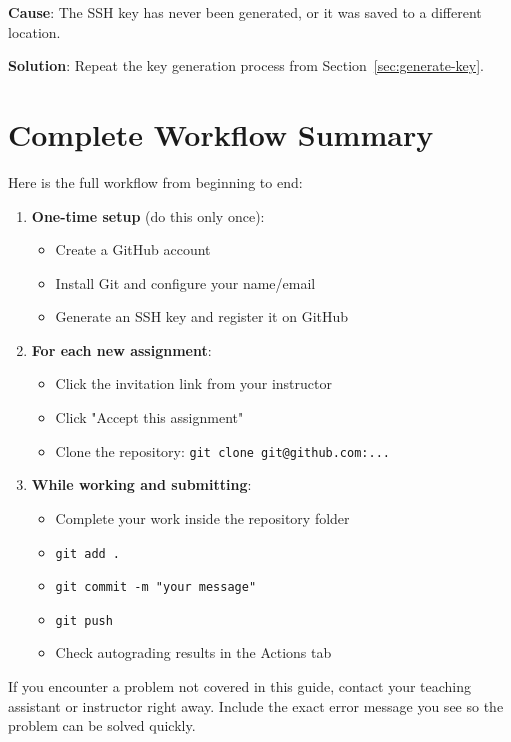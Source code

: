 \documentclass[
    a4paper,
    11pt,
    parskip=half
]{scrartcl}
\begin{document}
\textbf{Cause}: The SSH key has never been generated, or it was saved to a different location.

\textbf{Solution}: Repeat the key generation process from Section~\ref{sec:generate-key}.

\section{Complete Workflow Summary}
\label{sec:summary}

Here is the full workflow from beginning to end:

\begin{enumerate}
    \item \textbf{One-time setup} (do this only once):
    \begin{itemize}
        \item Create a GitHub account
        \item Install Git and configure your name/email
        \item Generate an SSH key and register it on GitHub
    \end{itemize}

    \item \textbf{For each new assignment}:
    \begin{itemize}
        \item Click the invitation link from your instructor
        \item Click "Accept this assignment"
        \item Clone the repository: \texttt{git clone git@github.com:...}
    \end{itemize}

    \item \textbf{While working and submitting}:
    \begin{itemize}
        \item Complete your work inside the repository folder
        \item \texttt{git add .}
        \item \texttt{git commit -m "your message"}
        \item \texttt{git push}
        \item Check autograding results in the Actions tab
    \end{itemize}
\end{enumerate}

\begin{notebox}
If you encounter a problem not covered in this guide, contact your teaching assistant or instructor right away. Include the exact error message you see so the problem can be solved quickly.
\end{notebox}
\end{document}
